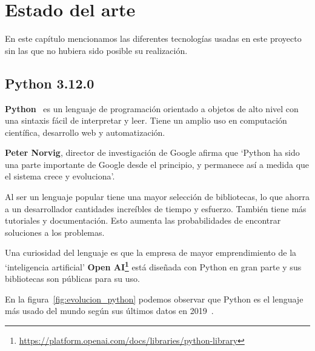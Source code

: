 \documentclass[a4paper, 12pt]{book}
\begin{document}

\cleardoublepage
\chapter{Estado del arte}
\label{chap:estado}
En este capítulo mencionamos las diferentes tecnologías  usadas en este proyecto sin las que no hubiera sido posible su realización.
 

\section{Python 3.12.0} 
\label{sec:python}
\textbf{Python}~\cite{oracle:_python} es un lenguaje de programación orientado a objetos de alto nivel con una sintaxis fácil de interpretar y leer. Tiene un amplio uso en computación científica, desarrollo web y automatización.

\textbf{Peter Norvig}, director de investigación de Google afirma que `Python ha sido una parte importante de Google desde el principio, y permanece así a medida que el sistema crece y evoluciona'.

Al ser un lenguaje popular tiene una mayor selección de bibliotecas, lo que ahorra a un desarrollador cantidades increíbles de tiempo y esfuerzo. También tiene más tutoriales y documentación. Esto aumenta las probabilidades de encontrar soluciones a los problemas.

Una curiosidad del lenguaje es que la empresa de mayor emprendimiento de la `inteligencia artificial'  \textbf{ Open AI\footnote{\url{https://platform.openai.com/docs/libraries/python-library}}} está diseñada con Python en gran parte y sus bibliotecas son públicas para su uso.

En la figura~\ref{fig:evolucion_python} podemos observar que Python es el lenguaje más usado del mundo según sus últimos datos en 2019~\cite{statista:_tecnología}.
\end{document}
